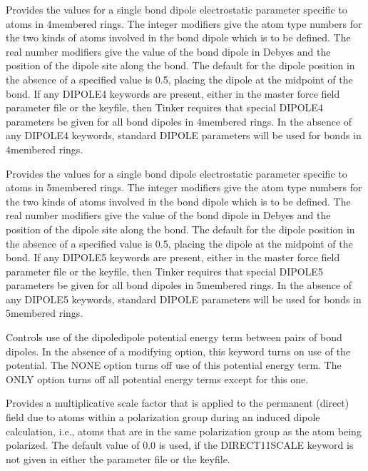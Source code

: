 \documentclass[letterpaper,11pt,english]{sphinxmanual}
\begin{document}
  Provides the values for a single bond dipole electrostatic parameter specific to atoms in 4\sphinxhyphen{}membered rings. The integer modifiers give the atom type numbers for the two kinds of atoms involved in the bond dipole which is to be defined. The real number modifiers give the value of the bond dipole in Debyes and the position of the dipole site along the bond. The default for the dipole position in the absence of a specified value is 0.5, placing the dipole at the midpoint of the bond. If any DIPOLE4 keywords are present, either in the master force field parameter file or the keyfile, then Tinker requires that special DIPOLE4 parameters be given for all bond dipoles in 4\sphinxhyphen{}membered rings. In the absence of any DIPOLE4 keywords, standard DIPOLE parameters will be used for bonds in 4\sphinxhyphen{}membered rings.

  Provides the values for a single bond dipole electrostatic parameter specific to atoms in 5\sphinxhyphen{}membered rings. The integer modifiers give the atom type numbers for the two kinds of atoms involved in the bond dipole which is to be defined. The real number modifiers give the value of the bond dipole in Debyes and the position of the dipole site along the bond. The default for the dipole position in the absence of a specified value is 0.5, placing the dipole at the midpoint of the bond. If any DIPOLE5 keywords are present, either in the master force field parameter file or the keyfile, then Tinker requires that special DIPOLE5 parameters be given for all bond dipoles in 5\sphinxhyphen{}membered rings. In the absence of any DIPOLE5 keywords, standard DIPOLE parameters will be used for bonds in 5\sphinxhyphen{}membered rings.

  Controls use of the dipole\sphinxhyphen{}dipole potential energy term between pairs of bond dipoles. In the absence of a modifying option, this keyword turns on use of the potential. The NONE option turns off use of this potential energy term. The ONLY option turns off all potential energy terms except for this one.

  Provides a multiplicative scale factor that is applied to the permanent (direct) field due to atoms within a polarization group during an induced dipole calculation, i.e., atoms that are in the same polarization group as the atom being polarized. The default value of 0.0 is used, if the DIRECT\sphinxhyphen{}11\sphinxhyphen{}SCALE keyword is not given in either the parameter file or the keyfile.
\end{document}
